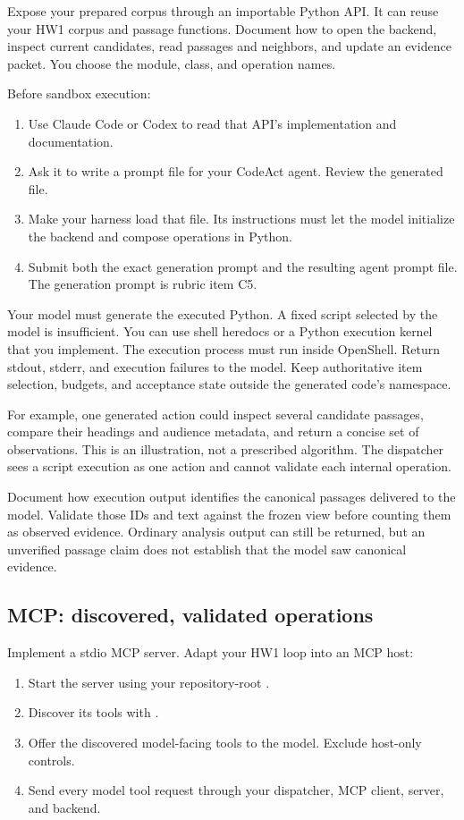 \documentclass[10pt,letterpaper]{article}
\newcommand{\code}[1]{\texttt{\detokenize{#1}}}
\begin{document}
Expose your prepared corpus through an importable Python API. It can reuse your HW1 corpus and passage functions.
Document how to open the backend, inspect current candidates, read passages and neighbors, and update an evidence packet.
You choose the module, class, and operation names.

Before sandbox execution:
\begin{enumerate}
\item Use Claude Code or Codex to read that API's implementation and documentation.
\item Ask it to write a prompt file for your CodeAct agent. Review the generated file.
\item Make your harness load that file. Its instructions must let the model initialize the backend and compose operations in Python.
\item Submit both the exact generation prompt and the resulting agent prompt file. The generation prompt is rubric item C5.
\end{enumerate}

Your model must generate the executed Python. A fixed script selected by the model is insufficient.
You can use shell heredocs or a Python execution kernel that you implement. The execution process must run inside OpenShell.
Return stdout, stderr, and execution failures to the model. Keep authoritative item selection, budgets, and acceptance state outside the generated code's namespace.

For example, one generated action could inspect several candidate passages, compare their headings and audience metadata, and return a concise set of observations.
This is an illustration, not a prescribed algorithm. The dispatcher sees a script execution as one action and cannot validate each internal operation.

Document how execution output identifies the canonical passages delivered to the model.
Validate those IDs and text against the frozen view before counting them as observed evidence.
Ordinary analysis output can still be returned, but an unverified passage claim does not establish that the model saw canonical evidence.

\subsection{MCP: discovered, validated operations}

Implement a stdio MCP server. Adapt your HW1 loop into an MCP host:
\begin{enumerate}
\item Start the server using your repository-root \code{mcp.json}.
\item Discover its tools with \code{tools/list}.
\item Offer the discovered model-facing tools to the model. Exclude host-only controls.
\item Send every model tool request through your dispatcher, MCP client, server, and backend.
\end{enumerate}
\end{document}
